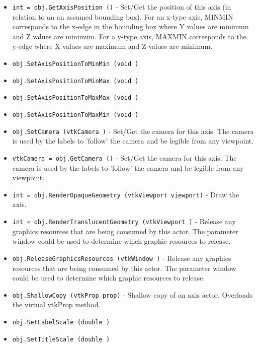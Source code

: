 \begin{itemize}
\item  \verb|int = obj.GetAxisPosition ()| -  Set/Get the position of this axis (in relation to an an
 assumed bounding box).  For an x-type axis, MINMIN corresponds
 to the x-edge in the bounding box where Y values are minimum and 
 Z values are minimum. For a y-type axis, MAXMIN corresponds to the 
 y-edge where X values are maximum and Z values are minimum.
 

\item  \verb|obj.SetAxisPositionToMinMin (void )|

\item  \verb|obj.SetAxisPositionToMinMax (void )|

\item  \verb|obj.SetAxisPositionToMaxMax (void )|

\item  \verb|obj.SetAxisPositionToMaxMin (void )|

\item  \verb|obj.SetCamera (vtkCamera )| -  Set/Get the camera for this axis.  The camera is used by the
 labels to 'follow' the camera and be legible from any viewpoint.

\item  \verb|vtkCamera = obj.GetCamera ()| -  Set/Get the camera for this axis.  The camera is used by the
 labels to 'follow' the camera and be legible from any viewpoint.

\item  \verb|int = obj.RenderOpaqueGeometry (vtkViewport viewport)| -  Draw the axis. 

\item  \verb|int = obj.RenderTranslucentGeometry (vtkViewport )| -  Release any graphics resources that are being consumed by this actor.
 The parameter window could be used to determine which graphic
 resources to release.

\item  \verb|obj.ReleaseGraphicsResources (vtkWindow )| -  Release any graphics resources that are being consumed by this actor.
 The parameter window could be used to determine which graphic
 resources to release.

\item  \verb|obj.ShallowCopy (vtkProp prop)| -  Shallow copy of an axis actor. Overloads the virtual vtkProp method.

\item  \verb|obj.SetLabelScale (double )|

\item  \verb|obj.SetTitleScale (double )|


\end{itemize}
